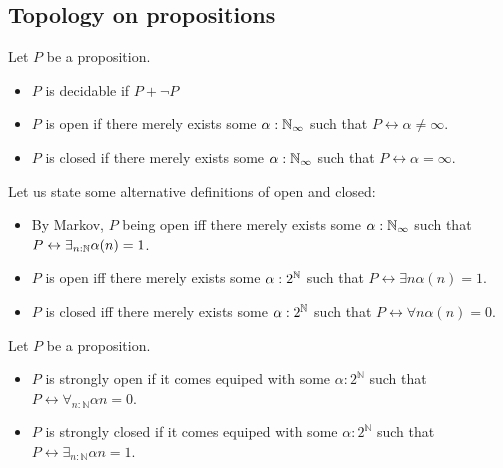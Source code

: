 \subsection{Topology on propositions}
\begin{definition}
  Let $P$ be a proposition. 
  \begin{itemize}
    \item $P$ is decidable if $P + \neg P$
    \item $P$ is open if there merely exists some $\alpha:\mathbb{N}_{\infty}$ such that $P \leftrightarrow \alpha \neq \infty$. 
    \item $P$ is closed if there merely exists some $\alpha:\mathbb{N}_{\infty}$ such that $P \leftrightarrow \alpha = \infty$. 
  \end{itemize}
\end{definition}



\begin{remark}
  Let us state some alternative definitions of open and closed:
  \begin{itemize}
    \item 
      By Markov, $P$ being open iff there merely exists some $\alpha:\mathbb{N}_{\infty}$ such that 
      $P\leftrightarrow \exists_{n:\mathbb{N}} \alpha(n) = 1$. 
    \item 
      $P$ is open iff there merely exists some $\alpha:2^{\mathbb{N}}$ such that $P\leftrightarrow \exists n \alpha(n) = 1$.
    \item 
      $P$ is closed iff there merely exists some $\alpha:2^{\mathbb{N}}$ such that $P\leftrightarrow \forall n \alpha(n) = 0$.
\end{itemize}
\end{remark}

\begin{definition}
  Let $P$ be a proposition. 
  \begin{itemize}
    \item $P$ is strongly open   if it comes equiped with some  $\alpha:2^\mathbb N$ such that $P \leftrightarrow \forall_{n:\mathbb N} \alpha n = 0 $. 
    \item $P$ is strongly closed if it comes equiped with some  $\alpha:2^\mathbb N$ such that 
      $P \leftrightarrow \exists_{n:\mathbb N} \alpha n = 1$. 
  \end{itemize}
\end{definition}

